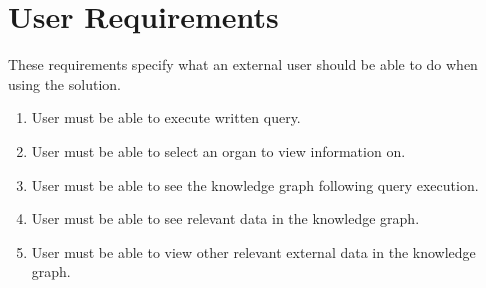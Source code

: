 \section{User Requirements}
\hspace{0.5cm} These requirements specify what an external user should be able to do when using the solution.
\begin{enumerate}
    \itemsep0em 
\item User must be able to execute written query.
\item User must be able to select an organ to view information on. 
\item User must be able to see the knowledge graph following query execution.
\item User must be able to see relevant data in the knowledge graph.
\item User must be able to view other relevant external data in the knowledge graph.
\end{enumerate}

